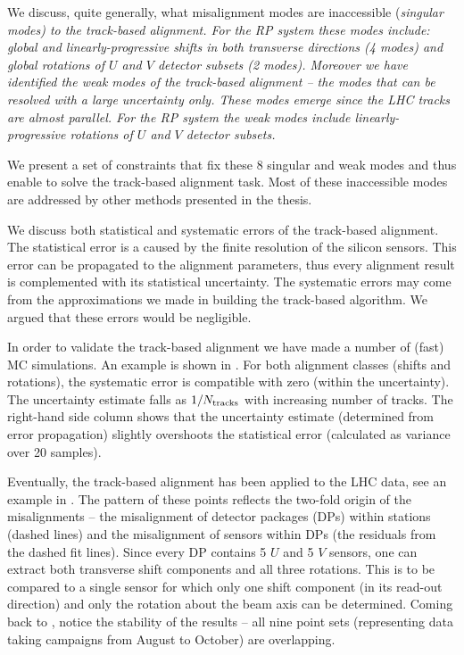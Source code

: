 We discuss, quite generally, what misalignment modes are inaccessible (\em{singular modes}) to the track-based alignment. For the RP system these modes include: global and linearly-progressive shifts in both transverse directions (4 modes) and global rotations of $U$ and $V$ detector subsets (2 modes). Moreover we have identified the \em{weak modes} of the track-based alignment -- the modes that can be resolved with a large uncertainty only. These modes emerge since the LHC tracks are almost parallel. For the RP system the weak modes include linearly-progressive rotations of $U$ and $V$ detector subsets.

We present a set of constraints that fix these 8 singular and weak modes and thus enable to solve the track-based alignment task. Most of these inaccessible modes are addressed by other methods presented in the thesis.

We discuss both statistical and systematic errors of the track-based alignment. The statistical error is a caused by the finite resolution of the silicon sensors. This error can be propagated to the alignment parameters, thus every alignment result is complemented with its statistical uncertainty. The systematic errors may come from the approximations we made in building the track-based algorithm. We argued that these errors would be negligible.

In order to validate the track-based alignment we have made a number of (fast) MC simulations. An example is shown in . For both alignment classes (shifts and rotations), the systematic error is compatible with zero (within the uncertainty). The uncertainty estimate falls as $1/N_{\rm tracks}$ with increasing number of tracks. The right-hand side column shows that the uncertainty estimate (determined from error propagation) slightly overshoots the statistical error (calculated as variance over 20 samples).


Eventually, the track-based alignment has been applied to the LHC data, see an example in . The pattern of these points reflects the two-fold origin of the misalignments -- the misalignment of detector packages (DPs) within stations (dashed lines) and the misalignment of sensors within DPs (the residuals from the dashed fit lines). Since every DP contains 5 $U$ and 5 $V$ sensors, one can extract both transverse shift components and all three rotations. This is to be compared to a single sensor for which only one shift component (in its read-out direction) and only the rotation about the beam axis can be determined. Coming back to , notice the stability of the results -- all nine point sets (representing data taking campaigns from August to October) are overlapping. 

